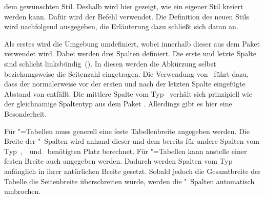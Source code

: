 \documentclass[english,ngerman]{tudscrartcl}
\begin{document}
dem gewünschten Stil. Deshalb wird hier gezeigt, wie ein eigener Stil kreiert 
werden kann. Dafür wird der Befehl  verwendet. Die 
Definition des neuen Stils  wird nachfolgend ausgegeben, 
die Erläuterung dazu schließt sich daran an.
%
\begin{Tutorial}
\end{Tutorial}
%
Als erstes wird die Umgebung  umdefiniert, wobei 
innerhalb dieser  aus dem Paket  verwendet 
wird. Dabei werden drei Spalten definiert. Die erste und letzte Spalte sind 
schlicht linksbündig~(). In diesen werden die Abkürzung selbst 
beziehungsweise die Seitenzahl eingetragen. Die Verwendung von~ 
führt dazu, dass der normalerweise vor der ersten und nach der letzten Spalte 
eingefügte Abstand von  entfällt. Die mittlere Spalte vom 
Typ~ verhält sich prinzipiell wie der gleichnamige Spaltentyp aus dem 
Paket . Allerdings gibt es hier eine Besonderheit.

Für "=Tabellen muss generell eine feste Tabellenbreite 
angegeben werden. Die Breite der "~Spalten wird anhand dieser und 
dem bereits für andere Spalten vom Typ~,~~und~ 
benötigten Platz berechnet. Für "=Tabellen kann anstelle 
einer festen Breite auch  angegeben werden. Dadurch werden 
Spalten vom Typ~ anfänglich in ihrer natürlichen Breite gesetzt. 
Sobald jedoch die Gesamtbreite der Tabelle die Seitenbreite überschreiten 
würde, werden die "~Spalten automatisch umbrochen.
\end{document}
